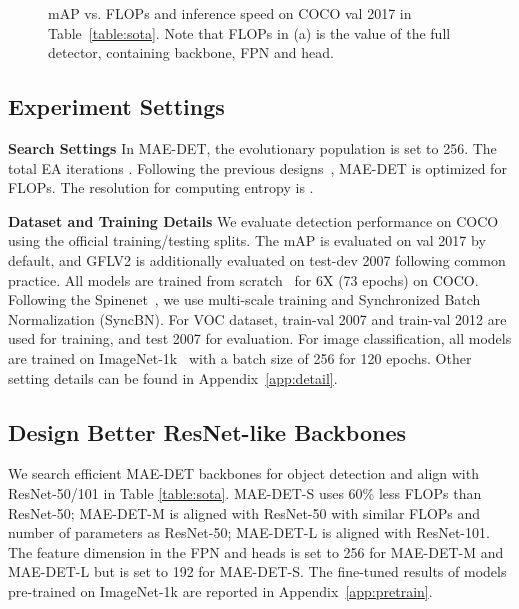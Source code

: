 \documentclass[nohyperref]{article}
\theoremstyle{plain}
\theoremstyle{definition}
\theoremstyle{remark}
\begin{document}
\begin{figure*}[h]
	\centering	
	\caption{mAP vs. FLOPs and inference speed on COCO val 2017 in Table~\ref{table:sota}. Note that FLOPs in (a) is the value of the full detector, containing backbone, FPN and head.}
	\label{fig:sota}	
\end{figure*}

\subsection{Experiment Settings}
\noindent\textbf{Search Settings} 
In MAE-DET, the evolutionary population  is set to 256. The total EA iterations . 
Following the previous designs~\citep{detnas,spnas,spinenet}, MAE-DET is optimized for FLOPs. The resolution for computing entropy is .

\noindent\textbf{Dataset and Training Details} 
We evaluate detection performance on COCO~\citep{coco} using the official training/testing splits. The mAP is evaluated on val 2017 by default, and GFLV2 is additionally evaluated on test-dev 2007 following common practice. All models are trained from scratch~\citep{scratch} for 6X (73 epochs) on COCO. Following the Spinenet~\citep{spinenet}, we use multi-scale training and Synchronized Batch Normalization (SyncBN). For VOC dataset, train-val 2007 and train-val 2012 are used for training, and test 2007 for evaluation. For image classification, all models are trained on ImageNet-1k~\citep{imagenet} with a batch size of 256 for 120 epochs. Other setting details can be found in Appendix~\ref{app:detail}.


\subsection{Design Better ResNet-like Backbones}
\label{sec:compare-MAE-DET-vs-resnet}


We search efficient MAE-DET backbones for object detection and align with ResNet-50/101 in Table \ref{table:sota}. MAE-DET-S uses 60\% less FLOPs than ResNet-50; MAE-DET-M is aligned with ResNet-50 with similar FLOPs and number of parameters as ResNet-50; MAE-DET-L is aligned with ResNet-101. The feature dimension in the FPN and heads is set to 256 for MAE-DET-M and MAE-DET-L but is set to 192 for MAE-DET-S. The fine-tuned results of models pre-trained on ImageNet-1k are reported in Appendix~\ref{app:pretrain}.
\end{document}
